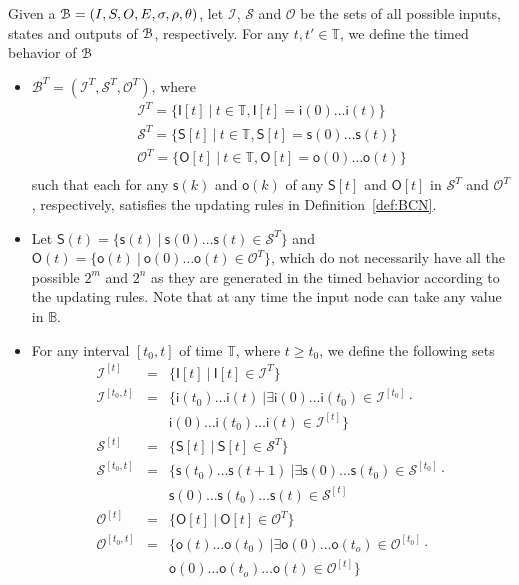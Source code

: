 Given a {\BCN} ${\mathcal{B}} = (I,S,O, E, \sigma, \rho,\theta)$, let $\mathcal{I}$, $\mathcal{S}$ and $\mathcal{O}$ be the sets of all possible inputs, states and outputs of ${\mathcal{B}}$, respectively. For any $t,t' \in \mathbb{T}$, we define the timed behavior of ${\mathcal{B}}$
\begin{itemize}
\item $\mathcal{B}^T = (\mathcal{I}^T, \mathcal{S}^T, \mathcal{O}^T)$,  where 
{\small \[\begin{array}{llll}
\mathcal{I}^T =\{\mathsf{I}[t]~|~ t\in \mathbb{T}, \mathsf{I}[t]=\mathsf{i}(0)\ldots \mathsf{i}(t)\}\\
\mathcal{S}^T =\{\mathsf{S}[t]~|~ t\in \mathbb{T}, \mathsf{S}[t]=\mathsf{s}(0)\ldots \mathsf{s}(t)\}\\
\mathcal{O}^T =\{\mathsf{O}[t]~|~ t\in \mathbb{T}, \mathsf{O}[t]=\mathsf{o}(0)\ldots \mathsf{o}(t)\}\\
\end{array}
\]} such that each for any $\mathsf{s}(k)$ and $\mathsf{o}(k)$ of any $\mathsf{S}[t]$ and 
$\mathsf{O}[t]$ in $\mathcal{S}^T$ and $\mathcal{O}^T$, respectively,   satisfies the updating rules in Definition~\ref{def:BCN}.
\item Let $\mathsf{S}(t) = \{ \mathsf{s}(t)~|~ \mathsf{s}(0)\ldots \mathsf{s}(t) \in \mathcal{S}^T\}$ and $\mathsf{O}(t) = \{ \mathsf{o}(t)~|~ \mathsf{o}(0)\ldots \mathsf{o}(t) \in \mathcal{O}^T\}$, which do not necessarily have all the possible $2^m$ and $2^n$ as they are generated in the timed behavior according to the updating rules. Note that at any time the input node can take any value in $\mathbb{B}$.
\item For any interval  $[t_0,t]$ of time $\mathbb{T}$, where $t\geq t_0$, we define the following sets 
\[\begin{array}{llllll}
\mathcal{I}^{[t]} &=& \{\mathsf{I}[t] ~|~ \mathsf{I}[t]\in \mathcal{I}^T\}\\
\mathcal{I}^{[t_0,t]} &=& \{\mathsf{i}(t_0)\ldots \mathsf{i}(t)~|\exists \mathsf{i}(0)\ldots \mathsf{i}(t_0)\in \mathcal{I}^{[t_0]}\cdot\\
&& \mathsf{i}(0)\ldots \mathsf{i}(t_0) \ldots \mathsf{i}(t)\in \mathcal{I}^{[t]}\} \\
\mathcal{S}^{[t]} &=& \{\mathsf{S}[t] ~|~ \mathsf{S}[t]\in \mathcal{S}^T\}\\
\mathcal{S}^{[t_0,t]} &=& \{\mathsf{s}(t_0)\ldots \mathsf{s}(t+1)~|\exists \mathsf{s}(0)\ldots \mathsf{s}(t_0)\in \mathcal{S}^{[t_0]}\cdot\\
&& \mathsf{s}(0)\ldots \mathsf{s}(t_0) \ldots \mathsf{s}(t)\in \mathcal{S}^{[t]} \\
\mathcal{O}^{[t]} &=& \{\mathsf{O}[t] ~|~ \mathsf{O}[t]\in \mathcal{O}^T\}\\
\mathcal{O}^{[t_0,t]} &=& \{\mathsf{o}(t)\ldots \mathsf{o}(t_0)~|\exists \mathsf{o}(0)\ldots \mathsf{o}(t_o)\in \mathcal{O}^{[t_0]}\cdot\\
&& \mathsf{o}(0)\ldots \mathsf{o}(t_o) \ldots \mathsf{o}(t)\in \mathcal{O}^{[t]} \}\\
\end{array}
\]
\end{itemize} 
